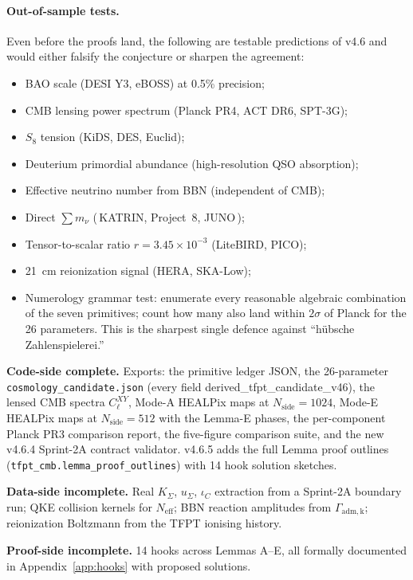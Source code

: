 \paragraph{Out-of-sample tests.} Even before the proofs land, the
following are testable predictions of v4.6 and would either
falsify the conjecture or sharpen the agreement:
\begin{itemize}[leftmargin=1.4em]
\item BAO scale (DESI Y3, eBOSS) at 0.5\% precision;
\item CMB lensing power spectrum (Planck PR4, ACT DR6, SPT-3G);
\item \(S_8\) tension (KiDS, DES, Euclid);
\item Deuterium primordial abundance (high-resolution QSO absorption);
\item Effective neutrino number from BBN (independent of CMB);
\item Direct \(\sum m_\nu\) (\,KATRIN, Project~8, JUNO\,);
\item Tensor-to-scalar ratio \(r=3.45\times 10^{-3}\) (LiteBIRD,
PICO);
\item 21~cm reionization signal (HERA, SKA-Low);
\item Numerology grammar test: enumerate every reasonable
algebraic combination of the seven primitives; count how many also
land within \(2\sigma\) of Planck for the 26 parameters.  This is the
sharpest single defence against ``hübsche Zahlenspielerei.''
\end{itemize}

\begin{tfptexports}
\textbf{Code-side complete.} Exports: the primitive ledger JSON, the
26-parameter \texttt{cosmology\_candidate.json} (every field
\textsf{derived\_tfpt\_candidate\_v46}), the lensed CMB spectra
\(C_\ell^{XY}\), Mode-A HEALPix maps at \(N_{\mathrm{side}}=1024\),
Mode-E HEALPix maps at \(N_{\mathrm{side}}=512\) with the Lemma-E
phases, the per-component Planck PR3 comparison report, the
five-figure comparison suite, and the new v4.6.4 Sprint-2A contract
validator.  v4.6.5 adds the full Lemma proof outlines
(\texttt{tfpt\_cmb.lemma\_proof\_outlines}) with 14 hook solution
sketches.

\textbf{Data-side incomplete.} Real \(K_\Sigma\), \(u_\Sigma\),
\(\iota_C\) extraction from a Sprint-2A boundary run; QKE collision
kernels for \(N_{\mathrm{eff}}\); BBN reaction amplitudes from
\(\Gamma_{\mathrm{adm,k}}\); reionization Boltzmann from the TFPT
ionising history.

\textbf{Proof-side incomplete.} 14 hooks across Lemmas A--E, all
formally documented in Appendix~\ref{app:hooks} with proposed
solutions.
\end{tfptexports}


